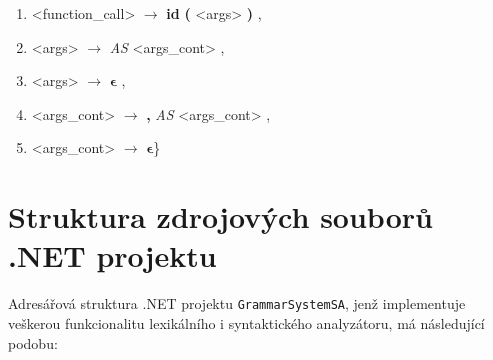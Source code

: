 \begin{enumerate}[label={\arabic*:}]
    \item <function\_call> $\longrightarrow$ \textbf{id} \textbf{(} <args> \textbf{)} ,
    \item <args> $\longrightarrow$ \emph{AS} <args\_cont> ,
    \item <args> $\longrightarrow$ $\mathbf{ \epsilon }$ ,
    \item <args\_cont> $\longrightarrow$ \textbf{,} \emph{AS} <args\_cont> ,
    \item <args\_cont> $\longrightarrow$ $\mathbf{ \epsilon }$\quad\}
\end{enumerate}


\chapter{Struktura zdrojových souborů .NET projektu} \label{priloha:StrukturaProgramu}
Adresářová struktura .NET projektu \verb|GrammarSystemSA|, jenž implementuje veškerou funkcionalitu lexikálního i syntaktického analyzátoru, má následující podobu:
